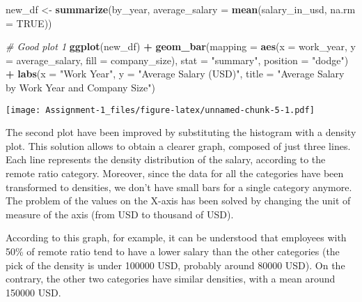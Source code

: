 \documentclass[
]{article}
\newenvironment{Shaded}{\begin{snugshade}}{\end{snugshade}}
\newcommand{\AttributeTok}[1]{\textcolor[rgb]{0.13,0.29,0.53}{#1}}
\newcommand{\CommentTok}[1]{\textcolor[rgb]{0.56,0.35,0.01}{\textit{#1}}}
\newcommand{\ConstantTok}[1]{\textcolor[rgb]{0.56,0.35,0.01}{#1}}
\newcommand{\FunctionTok}[1]{\textcolor[rgb]{0.13,0.29,0.53}{\textbf{#1}}}
\newcommand{\NormalTok}[1]{#1}
\newcommand{\OtherTok}[1]{\textcolor[rgb]{0.56,0.35,0.01}{#1}}
\newcommand{\SpecialCharTok}[1]{\textcolor[rgb]{0.81,0.36,0.00}{\textbf{#1}}}
\newcommand{\StringTok}[1]{\textcolor[rgb]{0.31,0.60,0.02}{#1}}
\begin{document}
\begin{Shaded}
\begin{Highlighting}[]
\NormalTok{new\_df }\OtherTok{\textless{}{-}} \FunctionTok{summarize}\NormalTok{(by\_year, }\AttributeTok{average\_salary =} \FunctionTok{mean}\NormalTok{(salary\_in\_usd, }\AttributeTok{na.rm =} \ConstantTok{TRUE}\NormalTok{))}

\CommentTok{\# Good plot 1}
\FunctionTok{ggplot}\NormalTok{(new\_df) }\SpecialCharTok{+}
  \FunctionTok{geom\_bar}\NormalTok{(}\AttributeTok{mapping =} \FunctionTok{aes}\NormalTok{(}\AttributeTok{x =}\NormalTok{ work\_year, }\AttributeTok{y =}\NormalTok{ average\_salary, }\AttributeTok{fill =}\NormalTok{ company\_size), }
           \AttributeTok{stat =} \StringTok{"summary"}\NormalTok{, }\AttributeTok{position =} \StringTok{"dodge"}\NormalTok{) }\SpecialCharTok{+} 
  \FunctionTok{labs}\NormalTok{(}\AttributeTok{x =} \StringTok{"Work Year"}\NormalTok{, }\AttributeTok{y =} \StringTok{"Average Salary (USD)"}\NormalTok{, }\AttributeTok{title =} \StringTok{"Average Salary by Work Year and Company Size"}\NormalTok{)}
\end{Highlighting}
\end{Shaded}

\texttt{[image: Assignment-1\_files/figure-latex/unnamed-chunk-5-1.pdf]}

\newline

The second plot have been improved by substituting the histogram with a
density plot. This solution allows to obtain a clearer graph, composed
of just three lines. Each line represents the density distribution of
the salary, according to the remote ratio category. Moreover, since the
data for all the categories have been transformed to densities, we don't
have small bars for a single category anymore. The problem of the values
on the X-axis has been solved by changing the unit of measure of the
axis (from USD to thousand of USD).

According to this graph, for example, it can be understood that
employees with 50\% of remote ratio tend to have a lower salary than the
other categories (the pick of the density is under 100000 USD, probably
around 80000 USD). On the contrary, the other two categories have
similar densities, with a mean around 150000 USD. \newline
\end{document}
